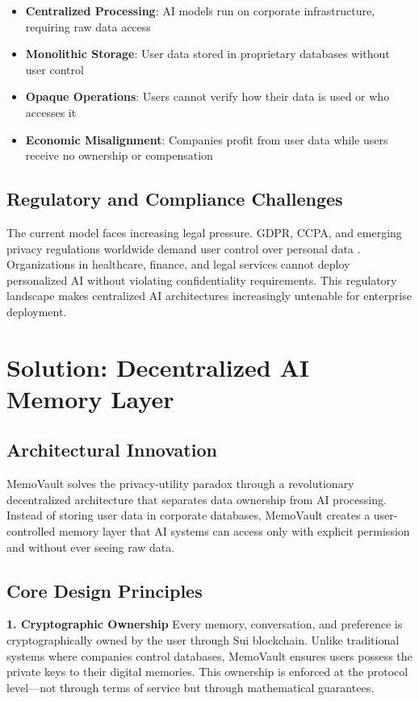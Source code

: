 \documentclass[12pt, a4paper]{article}
\begin{document}
\begin{itemize}
    \item \textbf{Centralized Processing}: AI models run on corporate infrastructure, requiring raw data access
    \item \textbf{Monolithic Storage}: User data stored in proprietary databases without user control
    \item \textbf{Opaque Operations}: Users cannot verify how their data is used or who accesses it
    \item \textbf{Economic Misalignment}: Companies profit from user data while users receive no ownership or compensation
\end{itemize}

\subsection{Regulatory and Compliance Challenges}

The current model faces increasing legal pressure. GDPR, CCPA, and emerging privacy regulations worldwide demand user control over personal data \cite{squire2025}. Organizations in healthcare, finance, and legal services cannot deploy personalized AI without violating confidentiality requirements. This regulatory landscape makes centralized AI architectures increasingly untenable for enterprise deployment.

\section{Solution: Decentralized AI Memory Layer}

\subsection{Architectural Innovation}

MemoVault solves the privacy-utility paradox through a revolutionary decentralized architecture that separates data ownership from AI processing. Instead of storing user data in corporate databases, MemoVault creates a user-controlled memory layer that AI systems can access only with explicit permission and without ever seeing raw data.

\subsection{Core Design Principles}

\textbf{1. Cryptographic Ownership}
Every memory, conversation, and preference is cryptographically owned by the user through Sui blockchain. Unlike traditional systems where companies control databases, MemoVault ensures users possess the private keys to their digital memories. This ownership is enforced at the protocol level—not through terms of service but through mathematical guarantees.
\end{document}
